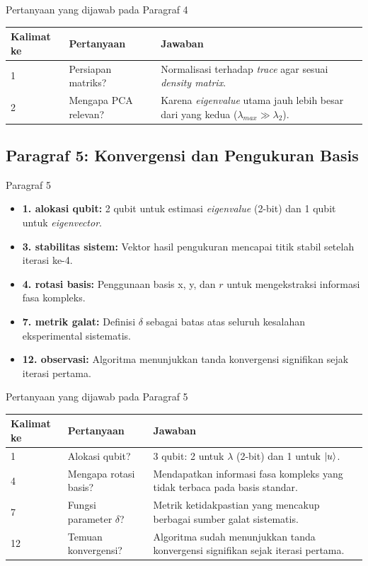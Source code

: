 \begin{frame}{Pertanyaan yang dijawab pada Paragraf 4}
    \centering
    \small
    \begin{tabular}{lp{4.5cm}p{6cm}}
        \toprule
        Kalimat ke & Pertanyaan & Jawaban \\
        \midrule
        1 & Persiapan matriks? & Normalisasi terhadap \textit{trace} agar sesuai \textit{density matrix}. \\
        2 & Mengapa PCA relevan? & Karena \textit{eigenvalue} utama jauh lebih besar dari yang kedua ($\lambda_{max} \gg \lambda_2$). \\
        \bottomrule
    \end{tabular}
\end{frame}

\subsection{Paragraf 5: Konvergensi dan Pengukuran Basis}
\begin{frame}{Paragraf 5}
    \begin{itemize}
        \item \textbf{1. alokasi qubit:} 2 qubit untuk estimasi \textit{eigenvalue} (2-bit) dan 1 qubit untuk \textit{eigenvector}.
        \item \textbf{3. stabilitas sistem:} Vektor hasil pengukuran mencapai titik stabil setelah iterasi ke-4.
        \item \textbf{4. rotasi basis:} Penggunaan basis x, y, dan $r$ untuk mengekstraksi informasi fasa kompleks.
        \item \textbf{7. metrik galat:} Definisi $\delta$ sebagai batas atas seluruh kesalahan eksperimental sistematis.
        \item \textbf{12. observasi:} Algoritma menunjukkan tanda konvergensi signifikan sejak iterasi pertama.
    \end{itemize}
\end{frame}

\begin{frame}{Pertanyaan yang dijawab pada Paragraf 5}
    \centering
    \small
    \begin{tabular}{lp{4.5cm}p{6cm}}
        \toprule
        Kalimat ke & Pertanyaan & Jawaban \\
        \midrule
        1 & Alokasi qubit? & 3 qubit: 2 untuk $\lambda$ (2-bit) dan 1 untuk $\ket{u}$. \\
        4 & Mengapa rotasi basis? & Mendapatkan informasi fasa kompleks yang tidak terbaca pada basis standar. \\
        7 & Fungsi parameter $\delta$? & Metrik ketidakpastian yang mencakup berbagai sumber galat sistematis. \\
        12 & Temuan konvergensi? & Algoritma sudah menunjukkan tanda konvergensi signifikan sejak iterasi pertama. \\
        \bottomrule
    \end{tabular}
\end{frame}

